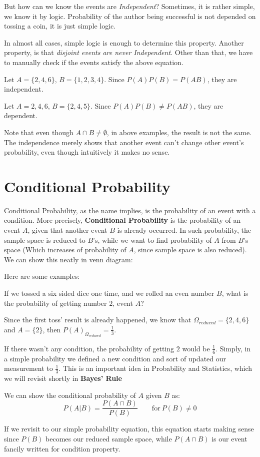 But how can we  know the events are \textit{Independent}? Sometimes, it is rather simple, we know it by logic. Probability of the author
being successful is not depended on tossing a coin, it is just simple logic.

In almost all cases, simple logic is enough to determine this property. Another property, is that \textit{disjoint events are never
Independent}. Other than that, we have to manually check if the events satisfy the above equation.
\begin{example}
    Let $A = \{ 2,4,6 \}$, $B = \{ 1,2,3,4 \}$. Since $P(A)P(B) = P(AB)$, they are independent.
\end{example}
\begin{example}
    Let $A = {2,4,6}$, $B = \{2,4,5 \}$. Since $P(A)P(B) \neq P(AB)$, they are dependent. \\
\end{example}
Note that even though $A \cap B  \neq \emptyset$, in above examples, the result is not the same. The independence merely shows that another
event can't change other event's probability, even though intuitively it makes no sense.
\section{Conditional Probability}
Conditional Probability, as the name implies, is the probability of an event with a condition. More precisely, \textbf{Conditional
Probability}  is the probability of an event $A$, given that another event $B$ is already occurred. In such probability, the sample space
is reduced to $B$'s, while we want to find probability of $A$ from $B$'s space (Which increases of probability of $A$, since sample space
is also reduced). We can show this neatly in venn diagram:

\par
Here are some examples:
\begin{example}
    If we tossed a six sided dice one time, and we rolled an even number $B$, what is the probability of getting number $2$, event $A$?
\end{example}
Since the first toss' result is already happened, we know that  $\Omega_{reduced}=\{2,4,6\}$ and  $A = \{2\}$, then
$P(A)_{\Omega_{reduced}}=\frac{1}{3}$.

If there wasn't any condition, the probability of getting $2$ would be $\frac{1}{6}$. Simply, in a simple probability we defined a new
condition and sort of updated our measurement to $\frac{1}{3}$. This is an important idea in Probability and Statistics, which we will
revisit shortly in \textbf{Bayes' Rule}
\par
We can show the conditional probability of $A$ given $B$ as:
$$ P(A | B) = \frac{P(A \cap B)}{P(B)} \qquad \text{for}\ P(B) \neq 0$$
\par
If we revisit to our simple probability equation, this equation starts making sense since $P(B)$ becomes our reduced sample space, while
$P(A \cap B)$ is our event fancily written for condition property.

